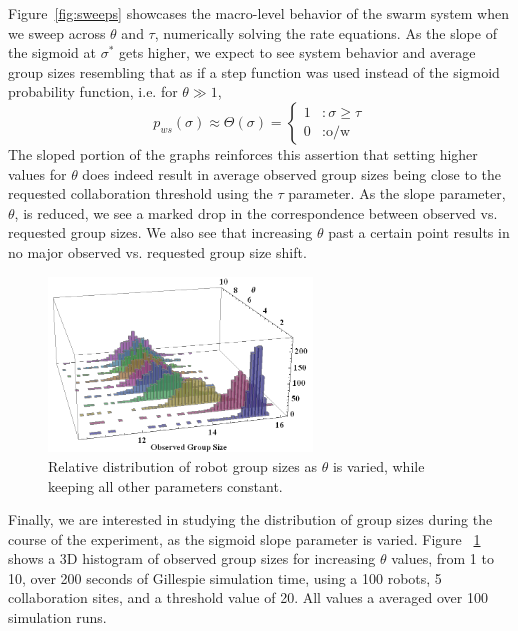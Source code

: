 \documentclass[Main.tex]{subfiles}
\begin{document}
Figure~\ref{fig:sweeps} showcases the macro-level behavior of the swarm system when we sweep across $\theta$ and $\tau$, numerically solving the rate equations. As the slope of the sigmoid at $\sigma^*$ gets higher, we expect to see system behavior and average group sizes resembling that as if a step function was used instead of the sigmoid probability function, i.e. for $\theta \gg 1$, 
\begin{equation*}
p_{ws}(\sigma) \approx \Theta(\sigma) = \left\{
\begin{array}{rl}
1 & : \sigma \geq \tau\\
0 & : \text{o/w}
\end{array}\right.
\end{equation*}
The sloped portion of the graphs reinforces this assertion that setting higher values for $\theta$ does indeed result in average observed group sizes being close to the requested collaboration threshold using the $\tau$ parameter. As the slope parameter, $\theta$, is reduced, we see a marked drop in the correspondence between observed vs. requested group sizes. We also see that increasing $\theta$ past a certain point results in no major observed vs. requested group size shift.

\begin{figure}[!tp]
\centering\includegraphics[width=7cm]{assets/distsweep.png}
\caption{Relative distribution of robot group sizes as $\theta$ is varied, while keeping all other parameters constant.}\label{fig:var}
\end{figure}

Finally, we are interested in studying the distribution of group sizes during the course of the experiment, as the sigmoid slope parameter is varied. Figure ~\ref{fig:var} shows a 3D histogram of observed group sizes for increasing $\theta$ values, from 1 to 10, over 200 seconds of Gillespie simulation time, using a 100 robots, 5 collaboration sites, and a threshold value of 20. All values a averaged over 100 simulation runs.
\end{document}
